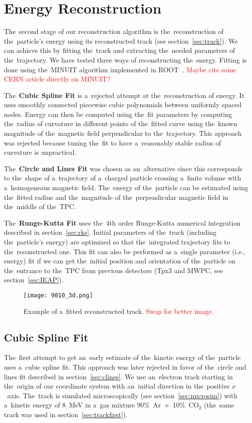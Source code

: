 \chapter{Energy Reconstruction}
\label{sec:energy}
	The~second stage of our reconstruction algorithm is the~reconstruction of the~particle's energy using its reconstructed track (see section~\ref{sec:track}). We can achieve this by fitting the~track and extracting the~needed parameters of the~trajectory. We have tested three ways of reconstructing the~energy. Fitting is done using the~MINUIT algorithm implemented in ROOT~\cite{ROOT}. \textcolor{red}{Maybe cite some CERN article directly on MINUIT?}
	
	The~\textbf{Cubic Spline Fit} is a~rejected attempt at the~reconstruction of energy. It uses smoothly connected piecewise cubic polynomials between uniformly spaced nodes. Energy can then be computed using the~fit parameters by computing the~radius of curvature in different points of the~fitted curve using the~known magnitude of the~magnetic field perpendicular to the~trajectory. This approach was rejected because tuning the~fit to have a~reasonably stable radius of curvature is unpractical.
	
	The~\textbf{Circle and Lines Fit} was chosen as an~alternative since this corresponds to the~shape of a~trajectory of a~charged particle crossing a~finite volume with a~homogeneous magnetic field. The~energy of the~particle can be estimated using the~fitted radius and the~magnitude of the~perpendicular magnetic field in the~middle of the~\ac{TPC}.
	
	The~\textbf{Runge-Kutta Fit} uses the~4th order Runge-Kutta numerical integration described in section~\ref{sec:rks}. Initial parameters of the~track (including the~particle's energy) are optimized so that the~integrated trajectory fits to the~reconstructed one. This fit can also be performed as a~single parameter (i.e., energy) fit if we can get the~initial position and orientation of the~particle on the~entrance to the~\ac{TPC} from previous detectors (\ac{Tpx3} and \ac{MWPC}, see section~\ref{sec:IEAP}).
	
	\begin{figure}
		\centering
		\texttt{[image: 9010\_3d.png]}
		\caption{Example of a~fitted reconstructed track. \textcolor{red}{Swap for better image.}}
		\label{fig:90103d}
	\end{figure}
	
	\section{Cubic Spline Fit}
	\label{sec:cspline}
		The~first attempt to get an~early estimate of the~kinetic energy of the~particle uses a~cubic spline fit. This approach was later rejected in favor of the~circle and lines fit described in section~\ref{sec:clines}. We use an~electron track starting in the~origin of our coordinate system with an~initial direction in the~positive $x$~axis. The~track is simulated microscopically (see section~\ref{sec:microsim}) with a~kinetic energy of 8~MeV in a~gas mixture 90\%~Ar~+~10\%~CO$_2$ (the~same track was used in section~\ref{sec:trackfirst}).
				
